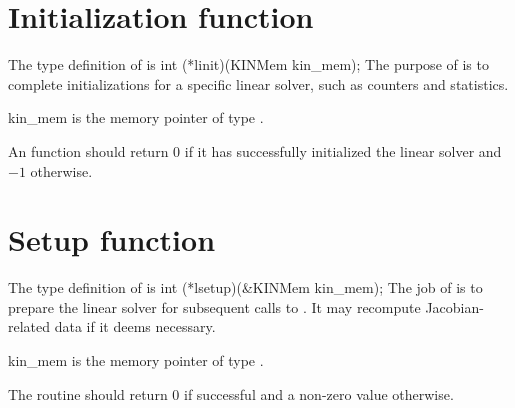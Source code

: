 
\section{Initialization function}
The type definition of  is
{
  int (*linit)(KINMem kin\_mem);
}
{
  The purpose of  is to complete initializations for      
  a specific linear solver, such as counters and statistics.        
}
{
  \begin{args}
  \item[kin\_mem]
    is the {\kinsol} memory pointer of type .
  \end{args}
}
{
  An  function should return $0$ if it 
  has successfully initialized the {\kinsol} linear solver and 
  $-1$ otherwise. 
}
{}


\section{Setup function} 
The type definition of  is
{
  int (*lsetup)(&KINMem kin\_mem);
}
{
  The job of  is to prepare the linear solver for subsequent 
  calls to . It may recompute Jacobian-related data if it 
  deems necessary. 
}
{
  \begin{args}
  \item[kin\_mem]
    is the {\kinsol} memory pointer of type .
  \end{args}
}
{
  The  routine should return $0$ if successful and
  a non-zero value otherwise.
}
{}


